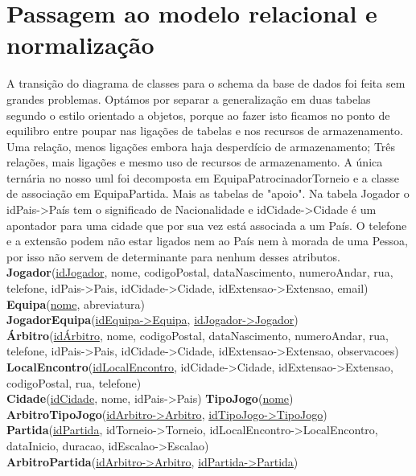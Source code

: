 \documentclass[a4paper]{article}
\begin{document}
\section{Passagem ao modelo relacional e normalização}
A transição do diagrama de classes para o schema da base de dados foi feita sem grandes problemas. Optámos por separar a generalização em duas tabelas segundo o estilo orientado a objetos, porque ao fazer isto ficamos no ponto de equilibro entre poupar nas ligações de tabelas e nos recursos de armazenamento. Uma relação, menos ligações embora haja desperdício de armazenamento; Três relações, mais ligações e mesmo uso de recursos de armazenamento. A única ternária no nosso uml foi decomposta em EquipaPatrocinadorTorneio e a classe de associação em EquipaPartida. Mais as tabelas de "apoio". Na tabela Jogador o idPais->País tem o significado de Nacionalidade e idCidade->Cidade é um apontador para uma cidade que por sua vez está associada a um País. O telefone e a extensão podem não estar ligados nem ao País nem à morada de uma Pessoa, por isso não servem de determinante para nenhum desses atributos.
\\\newline
\textbf{Jogador}(\underline{idJogador}, nome, codigoPostal, dataNascimento, numeroAndar, rua, telefone, idPais->Pais, idCidade->Cidade, idExtensao->Extensao, email) \\
\textbf{Equipa}(\underline{nome}, abreviatura) \\ %
\textbf{JogadorEquipa}(\underline{idEquipa->Equipa}, \underline{idJogador->Jogador}) \\
\textbf{Árbitro}(\underline{idÁrbitro}, nome, codigoPostal, dataNascimento, numeroAndar, rua, telefone, idPais->Pais, idCidade->Cidade, idExtensao->Extensao, observacoes) \\
\textbf{LocalEncontro}(\underline{idLocalEncontro}, idCidade->Cidade, idExtensao->Extensao, codigoPostal, rua, telefone) \\
\textbf{Cidade}(\underline{idCidade}, nome, idPais->Pais) \textbf{TipoJogo}(\underline{nome}) \\
\textbf{ArbitroTipoJogo}(\underline{idArbitro->Arbitro}, \underline{idTipoJogo->TipoJogo}) \\
\textbf{Partida}(\underline{idPartida}, idTorneio->Torneio, idLocalEncontro->LocalEncontro, dataInicio, duracao, idEscalao->Escalao) \\
\textbf{ArbitroPartida}(\underline{idArbitro->Arbitro}, \underline{idPartida->Partida}) \\
\end{document}
